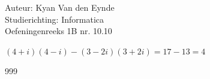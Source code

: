 \documentclass[a4paper]{article}
\begin{document}
  
\noindent \large Auteur: Kyan Van den Eynde \\
\noindent \large Studierichting: Informatica\\
\noindent \large Oefeningenreeks 1B nr. 10.10\\

\medskip

\normalsize

$(4+i)(4-i)-(3-2i)(3+2i)=17-13=4$\\

\begin{thebibliography}{999}
\end{thebibliography}
\end{document}
